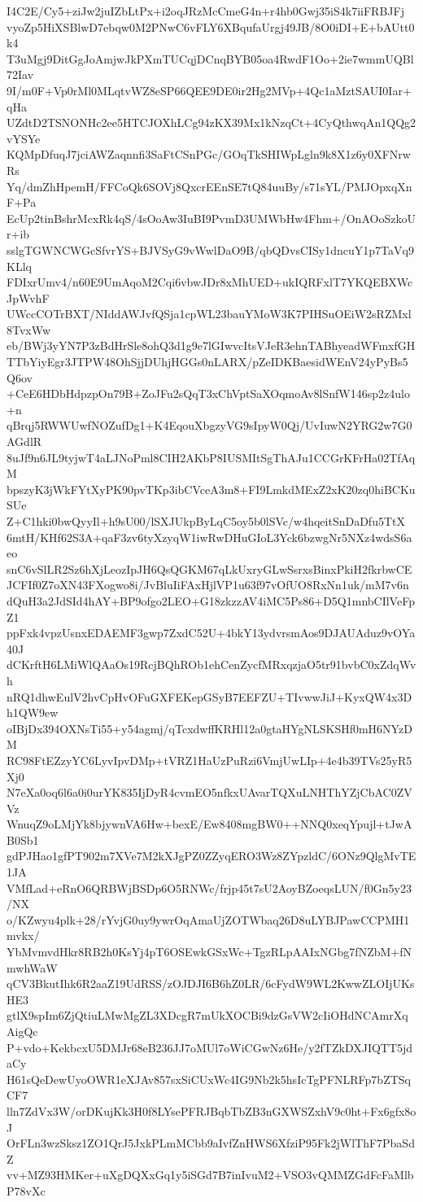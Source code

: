 I4C2E/Cy5+ziJw2juIZbLtPx+i2oqJRzMcCmeG4n+r4hb0Gwj35iS4k7iiFRBJFj
vyoZp5HiXSBlwD7ebqw0M2PNwC6vFLY6XBqufaUrgj49JB/8O0iDI+E+bAUtt0k4
T3uMgj9DitGgJoAmjwJkPXmTUCqjDCnqBYB05oa4RwdF1Oo+2ie7wmmUQBl72Iav
9I/m0F+Vp0rMl0MLqtvWZ8eSP66QEE9DE0ir2Hg2MVp+4Qc1aMztSAUI0Iar+qHa
UZdtD2TSNONHc2ee5HTCJOXhLCg94zKX39Mx1kNzqCt+4CyQthwqAn1QQg2vYSYe
KQMpDfuqJ7jciAWZaqnnfi3SaFtCSnPGc/GOqTkSHIWpLgln9k8X1z6y0XFNrwRs
Yq/dmZhHpemH/FFCoQk6SOVj8QxcrEEnSE7tQ84uuBy/s71sYL/PMJOpxqXnF+Pa
EcUp2tinBshrMcxRk4qS/4sOoAw3IuBI9PvmD3UMWbHw4Fhm+/OnAOoSzkoUr+ib
sslgTGWNCWGcSfvrYS+BJVSyG9vWwlDaO9B/qbQDvsCISy1dncuY1p7TaVq9KLlq
FDIxrUmv4/n60E9UmAqoM2Cqi6vbwJDr8xMhUED+ukIQRFxlT7YKQEBXWcJpWvhF
UWccCOTrBXT/NIddAWJvfQSja1cpWL23bauYMoW3K7PIHSuOEiW2sRZMxl8TvxWw
eb/BWj3yYN7P3zBdHrSle8ohQ3d1g9e7lGIwvcItsVJeR3ehnTABhyeadWFmxfGH
TTbYiyEgr3JTPW48OhSjjDUhjHGGs0nLARX/pZeIDKBaesidWEnV24yPyBs5Q6ov
+CeE6HDbHdpzpOn79B+ZoJFu2sQqT3xChVptSaXOqmoAv8lSnfW146sp2z4ulo+n
qBrqj5RWWUwfNOZufDg1+K4EqouXbgzyVG9sIpyW0Qj/UvIuwN2YRG2w7G0AGdlR
8uJf9n6JL9tyjwT4aLJNoPml8CIH2AKbP8IUSMItSgThAJu1CCGrKFrHa02TfAqM
bpszyK3jWkFYtXyPK90pvTKp3ibCVceA3m8+FI9LmkdMExZ2xK20zq0hiBCKuSUe
Z+C1hki0bwQyyIl+h9sU00/lSXJUkpByLqC5oy5b0lSVc/w4hqeitSnDaDfu5TtX
6mtH/KHf62S3A+qaF3zv6tyXzyqW1iwRwDHuGIoL3Yck6bzwgNr5NXz4wdsS6aeo
snC6vSlLR2Sz6hXjLeozIpJH6QsQGKM67qLkUxryGLwSsrxsBinxPkiH2fkrbwCE
JCFIf0Z7oXN43FXogwo8i/JvBluIiFAxHjlVP1u63f97vOfUO8RxNn1uk/mM7v6n
dQuH3a2JdSId4hAY+BP9ofgo2LEO+G18zkzzAV4iMC5Ps86+D5Q1mnbCIlVeFpZ1
ppFxk4vpzUsnxEDAEMF3gwp7ZxdC52U+4bkY13ydvrsmAos9DJAUAduz9vOYa40J
dCKrftH6LMiWlQAaOs19RcjBQhROb1ehCenZycfMRxqzjaO5tr91bvbC0xZdqWvh
nRQ1dhwEulV2hvCpHvOFuGXFEKepGSyB7EEFZU+TIvwwJiJ+KyxQW4x3Dh1QW9ew
oIBjDx394OXNsTi55+y54agmj/qTcxdwffKRHl12a0gtaHYgNLSKSHf0mH6NYzDM
RC98FtEZzyYC6LyvIpvDMp+tVRZ1HaUzPuRzi6VmjUwLIp+4e4b39TVs25yR5Xj0
N7eXa0oq6l6a0i0urYK835IjDyR4cvmEO5nfkxUAvarTQXuLNHThYZjCbAC0ZVVz
WnuqZ9oLMjYk8bjywnVA6Hw+bexE/Ew8408mgBW0++NNQ0xeqYpujl+tJwAB0Sb1
gdPJHao1gfPT902m7XVe7M2kXJgPZ0ZZyqERO3Wz8ZYpzldC/6ONz9QlgMvTE1JA
VMfLad+eRnO6QRBWjBSDp6O5RNWc/frjp45t7sU2AoyBZoeqsLUN/f0Gn5y23/NX
o/KZwyu4plk+28/rYvjG0uy9ywrOqAmaUjZOTWbaq26D8uLYBJPawCCPMH1mvkx/
YbMvmvdHkr8RB2h0KsYj4pT6OSEwkGSxWc+TgzRLpAAIxNGbg7fNZbM+fNmwhWaW
qCV3BkutIhk6R2aaZ19UdRSS/zOJDJI6B6hZ0LR/6cFydW9WL2KwwZLOIjUKsHE3
gtlX9spIm6ZjQtiuLMwMgZL3XDcgR7mUkXOCBi9dzGsVW2cIiOHdNCAmrXqAigQc
P+vdo+KekbcxU5DMJr68eB236JJ7oMUl7oWiCGwNz6He/y2fTZkDXJIQTT5jdaCy
H61sQeDewUyoOWR1eXJAv857sxSiCUxWc4IG9Nb2k5hsIcTgPFNLRFp7bZTSqCF7
lln7ZdVx3W/orDKujKk3H0f8LYsePFRJBqbTbZB3nGXWSZxhV9c0ht+Fx6gfx8oJ
OrFLn3wzSksz1ZO1QrJ5JxkPLmMCbb9aIvfZnHWS6XfziP95Fk2jWlThF7PbaSdZ
vv+MZ93HMKer+uXgDQXxGq1y5iSGd7B7inIvuM2+VSO3vQMMZGdFcFaMlbP78vXc
